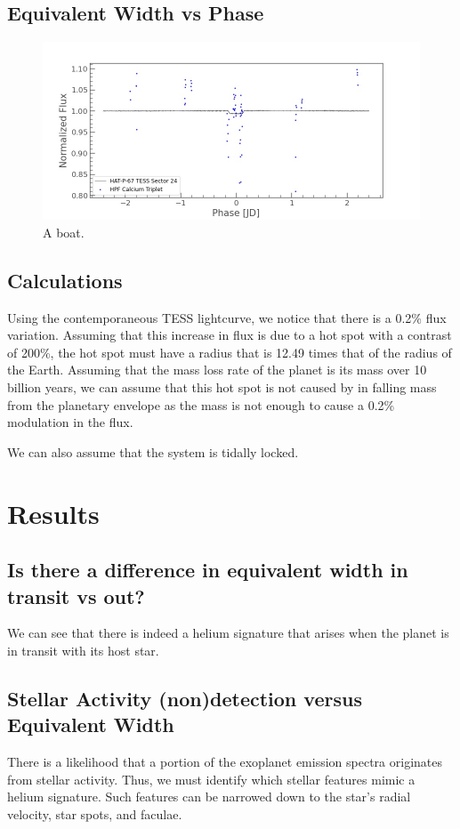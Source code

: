 \documentclass[modern]{aastex631}
\begin{document}
\subsection{Equivalent Width vs Phase}
\begin{figure}
    \includegraphics[width=\linewidth]{figures/TESS_EW_HAT-P-67.jpg}
    \caption{A boat.}
    \label{fig:boat1}
\end{figure}




\subsection{Calculations}
Using the contemporaneous TESS lightcurve, we notice that there is a 0.2\% flux variation. Assuming that this increase in flux is due to a hot spot with a contrast of 200\%, the hot spot must have a radius that is 12.49 times that of the radius of the Earth. Assuming that the mass loss rate of the planet is its mass over 10 billion years, we can assume that this hot spot is not caused by in falling mass from the planetary envelope as the mass is not enough to cause a 0.2\% modulation in the flux.

We can also assume that the system is tidally locked.

\section{Results}
\subsection{Is there a difference in equivalent width in transit vs out?}
We can see that there is indeed a helium signature that arises when the planet is in transit with its host star.
\subsection{Stellar Activity (non)detection versus Equivalent Width}
There is a likelihood that a portion of the exoplanet emission spectra originates from stellar activity. Thus, we must identify which stellar features mimic a helium signature. Such features can be narrowed down to the star's radial velocity, star spots, and faculae.
\end{document}
